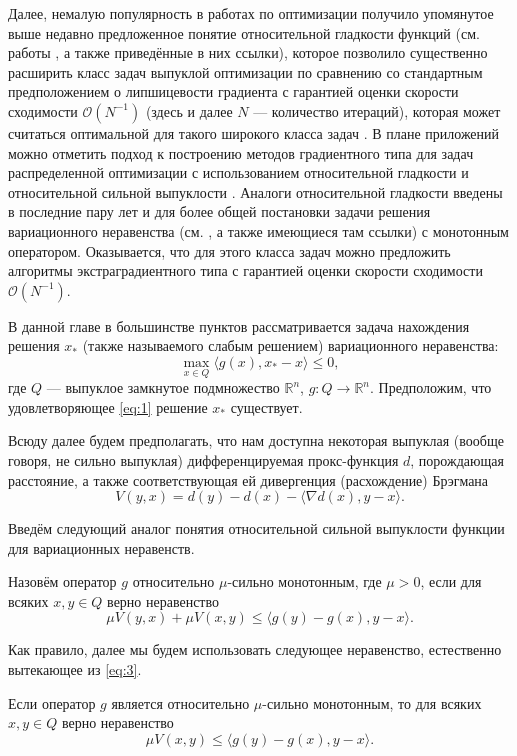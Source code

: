     Далее, немалую популярность в работах по оптимизации получило упомянутое выше недавно предложенное понятие относительной гладкости функций (см. работы \cite{Bauschke,Drag,Dragomir,Lu_Nesterov_2018}, а также приведённые в них ссылки), которое позволило существенно расширить класс задач выпуклой оптимизации по сравнению со стандартным предположением о липшицевости градиента с гарантией оценки скорости сходимости $\mathcal{O}(N^{-1})$ (здесь и далее $N$ --- количество итераций), которая может считаться оптимальной для такого широкого класса задач \cite{Dragomir}. В плане приложений можно отметить подход к построению методов градиентного типа для задач распределенной оптимизации с использованием относительной гладкости и относительной сильной выпуклости \cite{Hendr}. Аналоги относительной гладкости введены в последние пару лет и для более общей постановки задачи решения вариационного неравенства (см. \cite{Inex}, а также имеющиеся там ссылки) с монотонным оператором. Оказывается, что для этого класса задач можно предложить алгоритмы экстраградиентного типа с гарантией оценки скорости сходимости $\mathcal{O}(N^{-1})$. 

    В данной главе в большинстве пунктов рассматривается задача нахождения решения $x_*$ (также называемого слабым решением) вариационного неравенства: 
    \begin{equation}\label{eq:1}
        \max_{x \in Q} \langle g(x), x_* - x \rangle \leq 0,
    \end{equation}
    где $Q$ --- выпуклое замкнутое подмножество $\mathbb{R}^n$,
    $g: Q \longrightarrow \mathbb{R}^n$. Предположим, что удовлетворяющее \eqref{eq:1} решение $x_*$ существует.

    Всюду далее будем предполагать, что нам доступна некоторая выпуклая (вообще говоря, не сильно выпуклая) дифференцируемая прокс-функция $d$, порождающая расстояние, а также соответствующая ей дивергенция (расхождение) Брэгмана \cite{Bauschke}
    \begin{equation}\label{Brg_form}
        V(y, x) = d(y) - d(x) - \langle \nabla d(x), y - x \rangle.
    \end{equation}

    Введём следующий аналог понятия относительной сильной выпуклости функции \cite{Lu_Nesterov_2018} для вариационных неравенств.
    \begin{definition}\label{DefRelStrongMonot}
        Назовём оператор $g$ относительно $\mu$-сильно монотонным, где $\mu >0$, если для всяких $x, y \in Q$ верно неравенство
            \begin{equation}\label{eq:3}
                 \mu V(y, x) + \mu V(x, y) \leq \langle g(y) - g(x), y - x \rangle.
             \end{equation}
    \end{definition}
    Как правило, далее мы будем использовать следующее неравенство, естественно вытекающее из \eqref{eq:3}.
    \begin{remark}
        Если оператор $g$ является  относительно $\mu$-сильно монотонным, то для всяких $x, y \in Q$ верно неравенство
        $$
            \mu V(x, y) \leq \langle g(y) - g(x), y - x \rangle.
        $$
    \end{remark}

